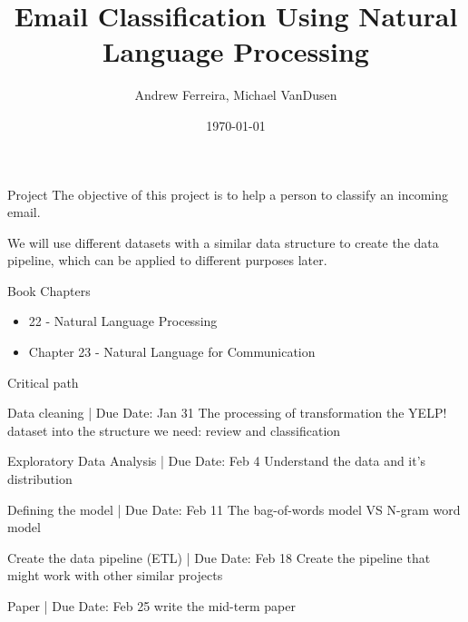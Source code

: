 \documentclass{beamer}
\title{Email Classification Using Natural Language Processing}
\author{Andrew Ferreira, Michael VanDusen}
\date{\today}
\begin{document}
\begin{frame}
    \titlepage
\end{frame}


\begin{frame}{Project}
The objective of this project is to help a person to classify an incoming email. 

We will use different datasets with a similar data structure to create the data pipeline, which can be applied to different purposes later. 
\end{frame}

\begin{frame}{Book Chapters}
\begin{itemize}
  \item 22 - Natural Language Processing
  \item Chapter 23 - Natural Language for Communication
\end{itemize}
\end{frame}

\begin{frame}{Critical path}

\begin{block}{Data cleaning | Due Date: Jan 31}
The processing of transformation the YELP! dataset into the structure we need:
review and classification
\end{block}

\begin{block}{Exploratory Data Analysis | Due Date: Feb 4}
Understand the data and it's distribution
\end{block}

\begin{alertblock}{Defining the model | Due Date: Feb 11}
The bag-of-words model VS N-gram word model
\end{alertblock}

\begin{block}{Create the data pipeline (ETL) | Due Date: Feb 18}
Create the pipeline that might work with other similar projects
\end{block}

\begin{block}{Paper | Due Date: Feb 25}
write the mid-term paper
\end{block}


\end{frame}
\end{document}
